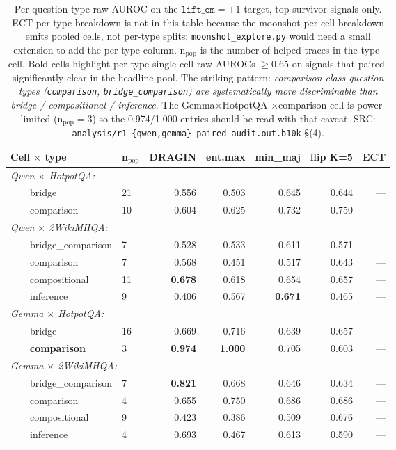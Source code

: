 \documentclass[11pt]{article}
\begin{document}
\begin{table}[h]
\centering\small
\begin{tabular}{@{}llrrrrr@{}}
\toprule
\textbf{Cell $\times$ type} & \textbf{n$_{\text{pop}}$} &
\textbf{DRAGIN} & \textbf{ent.max} & \textbf{min\_maj} &
\textbf{flip K=5} & \textbf{ECT} \\
\midrule
\multicolumn{7}{l}{\textit{Qwen $\times$ HotpotQA:}} \\
~~~~bridge      & 21 & 0.556 & 0.503 & 0.645 & 0.644 & --- \\
~~~~comparison  & 10 & 0.604 & 0.625 & 0.732 & 0.750 & --- \\
\midrule
\multicolumn{7}{l}{\textit{Qwen $\times$ 2WikiMHQA:}} \\
~~~~bridge\_comparison & 7 & 0.528 & 0.533 & 0.611 & 0.571 & --- \\
~~~~comparison         & 7 & 0.568 & 0.451 & 0.517 & 0.643 & --- \\
~~~~compositional      & 11 & \textbf{0.678} & 0.618 & 0.654 & 0.657 & --- \\
~~~~inference          & 9 & 0.406 & 0.567 & \textbf{0.671} & 0.465 & --- \\
\midrule
\multicolumn{7}{l}{\textit{Gemma $\times$ HotpotQA:}} \\
~~~~bridge            & 16 & 0.669 & 0.716 & 0.639 & 0.657 & --- \\
~~~~\textbf{comparison} & 3 & \textbf{0.974} & \textbf{1.000} & 0.705 & 0.603 & --- \\
\midrule
\multicolumn{7}{l}{\textit{Gemma $\times$ 2WikiMHQA:}} \\
~~~~bridge\_comparison & 7 & \textbf{0.821} & 0.668 & 0.646 & 0.634 & --- \\
~~~~comparison         & 4 & 0.655 & 0.750 & 0.686 & 0.686 & --- \\
~~~~compositional      & 9 & 0.423 & 0.386 & 0.509 & 0.676 & --- \\
~~~~inference          & 4 & 0.693 & 0.467 & 0.613 & 0.590 & --- \\
\bottomrule
\end{tabular}
\caption{Per-question-type raw AUROC on the $\texttt{lift\_em}=+1$ target,
top-survivor signals only.  ECT per-type breakdown is not in this table
because the moonshot per-cell breakdown emits pooled cells, not per-type
splits; \texttt{moonshot\_explore.py} would need a small extension to add
the per-type column. n$_{\text{pop}}$ is the number of helped traces in the
type-cell. Bold cells highlight per-type single-cell raw AUROCs $\geq 0.65$
on signals that paired-significantly clear in the headline pool. The
striking pattern: \emph{comparison-class question types
(\texttt{comparison}, \texttt{bridge\_comparison}) are systematically more
discriminable than bridge / compositional / inference}. The Gemma$\times$HotpotQA
$\times$comparison cell is power-limited (n$_{\text{pop}}{=}3$) so the
0.974/1.000 entries should be read with that caveat.  SRC:
\texttt{analysis/r1\_\{qwen,gemma\}\_paired\_audit.out.b10k} \S(4).}
\label{tab:per-type}
\end{table}
\end{document}
